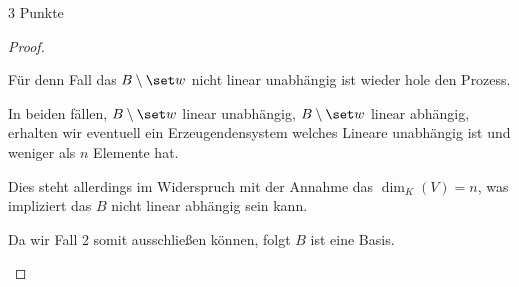 \documentclass{problemset}
\begin{document}
\begin{problem}{3 Punkte}
\begin{proof}
\begin{itemize}
\begin{itemize}
                        Für denn Fall das $B \setminus \set w$ nicht linear unabhängig ist wieder hole
                        den Prozess.

                        In beiden fällen, $B \setminus \set w$ linear unabhängig, $B \setminus \set w$
                        linear abhängig, erhalten wir eventuell ein Erzeugendensystem welches Lineare
                        unabhängig ist und weniger als $n$ Elemente hat.

                        Dies steht allerdings im Widerspruch mit der Annahme das $\dim_K(V) = n$, was
                        impliziert das $B$ nicht linear abhängig sein kann.
              \end{itemize}

              Da wir Fall 2 somit ausschließen können, folgt $B$ ist eine Basis. \checkmark
    \end{itemize}
\end{proof}
\end{problem}
\end{document}
